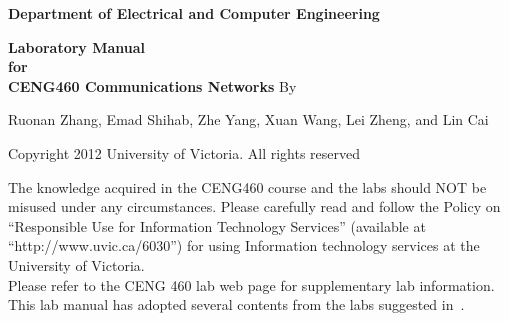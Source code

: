\documentclass[12pt]{report}
\begin{document}
\begin{titlepage}%
\begin{center}

\large

\bf{Department of Electrical and Computer Engineering}
\vspace{1cm}

\Large
\textbf{Laboratory Manual\\ for \\CENG460  Communications Networks}
\bigskip
\bigskip
\bigskip
\vfill
\large
By

\bigskip

\normalsize

 Ruonan Zhang, Emad Shihab, Zhe Yang, Xuan Wang,  Lei Zheng, and Lin Cai


\vspace{3.5in}

\small
Copyright 2012 University of Victoria. All rights reserved

\vfill

\end{center}
\end{titlepage}

\newpage

\newpage   
\thispagestyle{empty}
\noindent The knowledge acquired in the CENG460 course and the labs should NOT be misused under any circumstances.  Please carefully read and follow
the Policy on ``Responsible Use for Information Technology Services'' (available at ``http://www.uvic.ca/6030'') for using Information
technology services at the University of Victoria.\\

\noindent Please refer to the CENG 460 lab web page for supplementary lab information. \\

\noindent  This lab manual has adopted several contents from the labs suggested in~\cite{umass, Matthews04,Tanenbaum10,  topdown}. \\


\newpage


\tableofcontents











\end{document}
